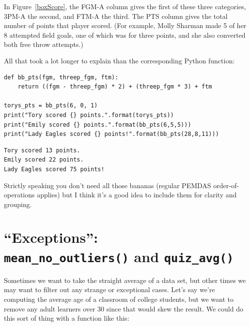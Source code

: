 In Figure~\ref{boxScore}, the \textsf{FGM-A} column gives the first of these
three categories, \textsf{3PM-A} the second, and \textsf{FTM-A} the third. The
\textsf{PTS} column gives the total number of points that player scored. (For
example, Molly Sharman made 5 of her 8 attempted field goals, one of which was
for three points, and she also converted both free throw attempts.)

All that took a lot longer to explain than the corresponding Python function:


\begin{Verbatim}[fontsize=\footnotesize,samepage=true,frame=single,framesep=3mm]
def bb_pts(fgm, threep_fgm, ftm):
    return ((fgm - threep_fgm) * 2) + (threep_fgm * 3) + ftm

torys_pts = bb_pts(6, 0, 1)
print("Tory scored {} points.".format(torys_pts))
print("Emily scored {} points.".format(bb_pts(6,5,5)))
print("Lady Eagles scored {} points!".format(bb_pts(28,8,11)))
\end{Verbatim}
\vspace{-.2in}

\begin{Verbatim}[fontsize=\small,samepage=true,frame=leftline,framesep=5mm,framerule=1mm]
Tory scored 13 points.
Emily scored 22 points.
Lady Eagles scored 75 points!
\end{Verbatim}


Strictly speaking you don't need all those bananas (regular PEMDAS
order-of-operations applies) but I think it's a good idea to include them for
clarity and grouping.

\section{``Exceptions'':\texorpdfstring{\\}{ }\texttt{mean\_no\_outliers()} and \texttt{quiz\_avg()}}

Sometimes we want to take the straight average of a data set, but other times
we may want to filter out any strange or exceptional cases. Let's say we're
computing the average age of a classroom of college students, but we want to
remove any adult learners over 30 since that would skew the result. We could do
this sort of thing with a function like this:


